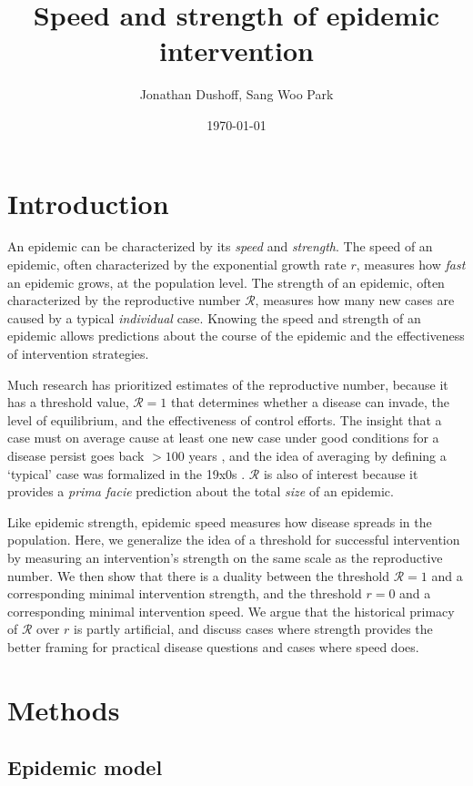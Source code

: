 \documentclass{article}\usepackage[]{graphicx}\usepackage[]{color}
\title{Speed and strength of epidemic intervention}
\author{Jonathan Dushoff, Sang Woo Park}
\date{\today}
\newcommand{\RR}{\ensuremath{{\mathcal R}}}
\begin{document}
\maketitle

\section{Introduction}

An epidemic can be characterized by its \emph{speed} and \emph{strength}.
The speed of an epidemic, often characterized by the exponential growth rate $r$, measures how \emph{fast} an epidemic grows, at the population level. 
The strength of an epidemic, often characterized by the reproductive number $\RR$, measures how many new cases are caused by a typical \emph{individual} case.
Knowing the speed and strength of an epidemic allows predictions about the course of the epidemic and the effectiveness of intervention strategies.

Much research has prioritized estimates of the reproductive number, because it has a threshold value, $\RR=1$ that determines whether a disease can invade, the level of equilibrium, and the effectiveness of control efforts. 
The insight that a case must on average cause at least one new case under good conditions for a disease persist goes back $>100$ years \cite{Ross}, and the idea of averaging by defining a `typical' case was formalized in the 19x0s \cite{Heesterbeek}.
$\RR$ is also of interest because it provides a \emph{prima facie} prediction about the total \emph{size} of an epidemic. 

Like epidemic strength, epidemic speed measures how disease spreads in the population. Here, we generalize the idea of a threshold for successful intervention by measuring an intervention's strength on the same scale as the reproductive number. We then show that there is a duality between the threshold $\RR=1$ and a corresponding minimal intervention strength, and the threshold $r=0$ and a corresponding minimal intervention speed. We argue that the historical primacy of $\RR$ over $r$ is partly artificial, and discuss cases where strength provides the better framing for practical disease questions and cases where speed does.

\section{Methods}

\subsection{Epidemic model}
\end{document}
